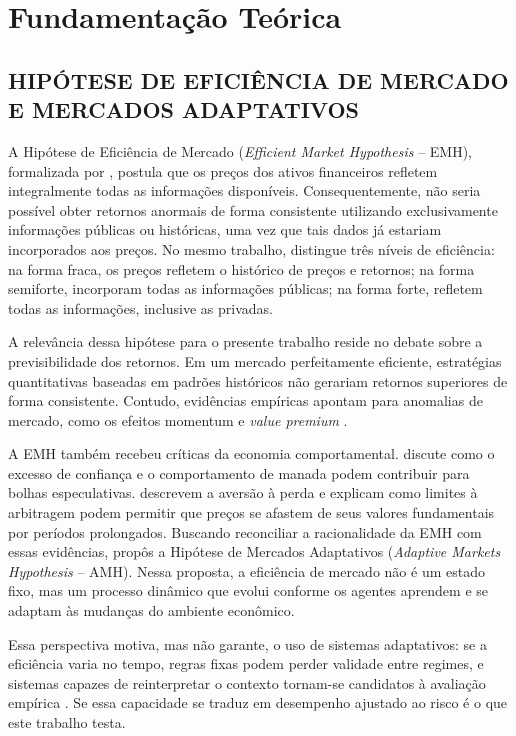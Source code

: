 \chapter{Fundamentação Teórica}
\label{cha:fundamentacao}

\section{HIPÓTESE DE EFICIÊNCIA DE MERCADO E MERCADOS ADAPTATIVOS}

A Hipótese de Eficiência de Mercado (\textit{Efficient Market Hypothesis} -- EMH), formalizada por \citet{Fama1970}, postula que os preços dos ativos financeiros refletem integralmente todas as informações disponíveis. Consequentemente, não seria possível obter retornos anormais de forma consistente utilizando exclusivamente informações públicas ou históricas, uma vez que tais dados já estariam incorporados aos preços. No mesmo trabalho, \citet{Fama1970} distingue três níveis de eficiência: na forma fraca, os preços refletem o histórico de preços e retornos; na forma semiforte, incorporam todas as informações públicas; na forma forte, refletem todas as informações, inclusive as privadas.

A relevância dessa hipótese para o presente trabalho reside no debate sobre a previsibilidade dos retornos. Em um mercado perfeitamente eficiente, estratégias quantitativas baseadas em padrões históricos não gerariam retornos superiores de forma consistente. Contudo, evidências empíricas apontam para anomalias de mercado, como os efeitos momentum e \textit{value premium} \citep{FamaFrench1992, JegadeeshTitman1993}.

A EMH também recebeu críticas da economia comportamental. \citet{Shiller2000} discute como o excesso de confiança e o comportamento de manada podem contribuir para bolhas especulativas. \citet{BarberisThaler2005} descrevem a aversão à perda e explicam como limites à arbitragem podem permitir que preços se afastem de seus valores fundamentais por períodos prolongados. Buscando reconciliar a racionalidade da EMH com essas evidências, \citet{Lo2004} propôs a Hipótese de Mercados Adaptativos (\textit{Adaptive Markets Hypothesis} -- AMH). Nessa proposta, a eficiência de mercado não é um estado fixo, mas um processo dinâmico que evolui conforme os agentes aprendem e se adaptam às mudanças do ambiente econômico.

Essa perspectiva motiva, mas não garante, o uso de sistemas adaptativos: se a eficiência varia no tempo, regras fixas podem perder validade entre regimes, e sistemas capazes de reinterpretar o contexto tornam-se candidatos à avaliação empírica \citep{Lo2004}. Se essa capacidade se traduz em desempenho ajustado ao risco é o que este trabalho testa.

